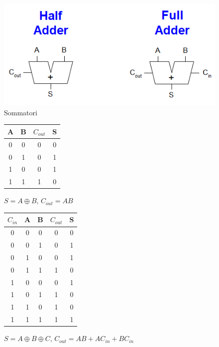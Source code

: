 \documentclass{article}
\begin{document}
    \begin{figure}[ht]
        \centering
        \includegraphics[width=0.8\linewidth]{adder.png}
        \caption{Sommatori}
        \label{fig:adder}
    \end{figure}

\begin{figure}[ht]
    \begin{minipage}[t]{0.49\textwidth}
        \centering
        \begin{table}[H]
        \centering
        \begin{tabular}{cc|cc}
            A & B & $C_{out}$ & S\\
            \hline
            0 & 0 & 0 & 0\\
            0 & 1 & 0 & 1\\
            1 & 0 & 0 & 1\\
            1 & 1 & 1 & 0
        \end{tabular}
    \label{tab:half_add}
    \end{table}
    $S=A\oplus B$,
    $C_{out}=AB$
    \end{minipage}
    \begin{minipage}[t]{0.49\textwidth}
    \centering
        \begin{table}[H]
        \centering
        \begin{tabular}{ccc|cc}
            $C_{in}$ & A & B & $C_{out}$ & S\\
            \hline
            0 & 0 & 0 & 0 & 0\\
            0 & 0 & 1 & 0 & 1\\
            0 & 1 & 0 & 0 & 1\\
            0 & 1 & 1 & 1 & 0\\
            1 & 0 & 0 & 0 & 1\\
            1 & 0 & 1 & 1 & 0\\
            1 & 1 & 0 & 1 & 0\\
            1 & 1 & 1 & 1 & 1
        \end{tabular}
    \label{tab:full_add}
    \end{table}
    $S=A\oplus B \oplus C$,
    $C_{out}=AB+AC_{in}+BC_{in}$
\end{minipage}
\end{figure}
\end{document}
